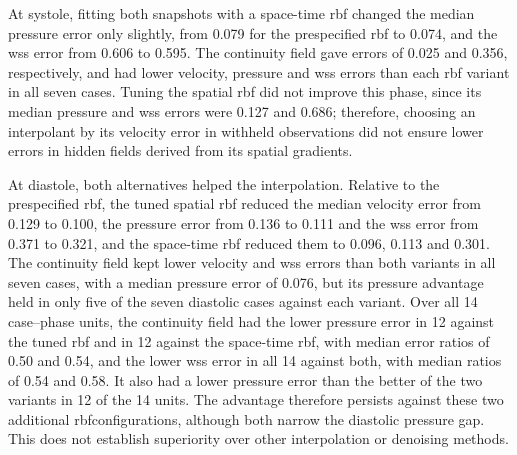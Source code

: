 \documentclass[12pt,a4paper]{article}
\newcommand{\WSS}{\ac{wss}\xspace}
\newcommand{\RBF}{\ac{rbf}\xspace}
\theoremstyle{definition}
\numberwithin{equation}{section}
\providecommand{\DIFaddtex}[1]{{\protect\color{blue} \sf #1}} %
\providecommand{\DIFdeltex}[1]{{\protect\color{red} \scriptsize #1}} %
\providecommand{\DIFaddbegin}{} %
\providecommand{\DIFaddend}{} %
\providecommand{\DIFdelbegin}{} %
\providecommand{\DIFdelend}{} %
\providecommand{\DIFadd}[1]{\texorpdfstring{\DIFaddtex{#1}}{#1}} %
\providecommand{\DIFdel}[1]{\texorpdfstring{\DIFdeltex{#1}}{}} %
\newcommand{\DIFscaledelfig}{0.5}
\newlength{\DIFdelgraphicswidth} %
\newlength{\DIFdelgraphicsheight} %
\newcommand{\DIFaddincludegraphics}[2][]{{\color{blue}\fbox{\DIFOincludegraphics[#1]{#2}}}} %
\newcommand{\DIFdelincludegraphics}[2][]{%
\sbox{\DIFdelgraphicsbox}{\DIFOincludegraphics[#1]{#2}}%
\settoboxwidth{\DIFdelgraphicswidth}{\DIFdelgraphicsbox} %
\settoboxtotalheight{\DIFdelgraphicsheight}{\DIFdelgraphicsbox} %
\scalebox{\DIFscaledelfig}{%
\parbox[b]{\DIFdelgraphicswidth}{\usebox{\DIFdelgraphicsbox}\\[-\baselineskip] \rule{\DIFdelgraphicswidth}{0em}}\llap{\resizebox{\DIFdelgraphicswidth}{\DIFdelgraphicsheight}{%
\setlength{\unitlength}{\DIFdelgraphicswidth}%
\begin{picture}(1,1)%
\thicklines\linethickness{2pt} %
{\color[rgb]{1,0,0}\put(0,0){\framebox(1,1){}}}%
{\color[rgb]{1,0,0}\put(0,0){\line( 1,1){1}}}%
{\color[rgb]{1,0,0}\put(0,1){\line(1,-1){1}}}%
\end{picture}%
}\hspace*{3pt}}} %
} %
\DeclareRobustCommand{\DIFaddbegin}{\DIFOaddbegin \let\includegraphics\DIFaddincludegraphics} %
\DeclareRobustCommand{\DIFaddend}{\DIFOaddend \let\includegraphics\DIFOincludegraphics} %
\DeclareRobustCommand{\DIFdelbegin}{\DIFOdelbegin \let\includegraphics\DIFdelincludegraphics} %
\DeclareRobustCommand{\DIFdelend}{\DIFOaddend \let\includegraphics\DIFOincludegraphics} %
\renewcommand{\DIFaddtex}[1]{{\protect\color{red}#1}}
\renewcommand{\DIFdeltex}[1]{}
\renewcommand{\DIFdel}[1]{}
\renewcommand{\DIFaddincludegraphics}[2][]{\DIFOincludegraphics[#1]{#2}}
\renewcommand{\DIFdelincludegraphics}[2][]{}
\def\DIFaddbegin{}\def\DIFaddend{}%
\def\DIFdelbegin{}\def\DIFdelend{}%
\begin{document}
At systole, fitting both snapshots with a space-time \RBF changed the median pressure error only slightly, from 0.079 for the prespecified \RBF to 0.074, and the \WSS error from 0.606 to 0.595. The continuity field gave errors of 0.025 and 0.356, respectively, and had lower velocity, pressure and \WSS errors than each \RBF variant in all seven cases. Tuning the spatial \RBF did not improve this phase, since its median pressure and \WSS errors were 0.127 and 0.686; therefore, choosing an interpolant by its velocity error in withheld observations did not ensure lower errors in hidden fields derived from its spatial gradients.

At diastole, both alternatives helped the interpolation. Relative to the prespecified \RBF, the tuned spatial \RBF reduced the median velocity error from 0.129 to 0.100, the pressure error from 0.136 to 0.111 and the \WSS error from 0.371 to 0.321, and the space-time \RBF reduced them to 0.096, 0.113 and 0.301. The continuity field kept lower velocity and \WSS errors than both variants in all seven cases, with a median pressure error of 0.076, but its pressure advantage held in only five of the seven diastolic cases against each variant. Over all 14 case--phase units, the continuity field had the lower pressure error in 12 against the tuned \RBF and in 12 against the space-time \RBF, with median error ratios of 0.50 and 0.54, and the lower \WSS error in all 14 against both, with median ratios of 0.54 and 0.58. It also had a lower pressure error than the better of the two variants in 12 of the 14 units. The \DIFdelbegin \DIFdel{comparison against the prespecified }\DIFdelend \DIFaddbegin \DIFadd{advantage therefore persists against these two additional }\DIFaddend \RBF \DIFdelbegin \DIFdel{is therefore not an artifact of a weak interpolant, although a stronger interpolant narrows }\DIFdelend \DIFaddbegin \DIFadd{configurations, although both narrow }\DIFaddend the diastolic pressure gap. \DIFaddbegin \DIFadd{This does not establish superiority over other interpolation or denoising methods.
}\DIFaddend 
\end{document}
